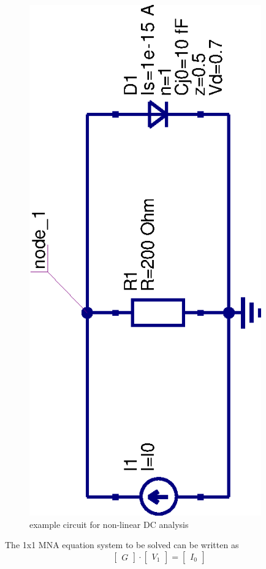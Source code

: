 \begin{figure}[ht]
\begin{center}
\includegraphics[angle=-90,width=10cm]{NLexample}
\end{center}
\caption{example circuit for non-linear DC analysis}
\label{fig:NLexample}
\end{figure}
\FloatBarrier

The 1x1 MNA equation system to be solved can be written as
\begin{equation}
\begin{bmatrix}
G
\end{bmatrix}
\cdot
\begin{bmatrix}
V_{1}
\end{bmatrix}
=
\begin{bmatrix}
I_{0}
\end{bmatrix}
\label{eq:NLmatrix}
\end{equation}

